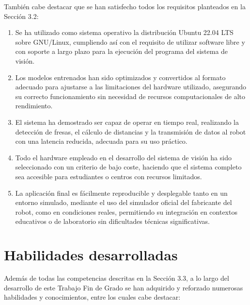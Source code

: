 También cabe destacar que se han satisfecho todos los requisitos planteados en la Sección 3.2:

\begin{enumerate}
    \item Se ha utilizado como sistema operativo la distribución Ubuntu 22.04 LTS sobre GNU/Linux, cumpliendo así con el requisito de utilizar software libre y con soporte a largo plazo para la ejecución del programa del sistema de visión.
    \item Los modelos entrenados han sido optimizados y convertidos al formato adecuado para ajustarse a las limitaciones del hardware utilizado, asegurando su correcto funcionamiento sin necesidad de recursos computacionales de alto rendimiento.
    \item El sistema ha demostrado ser capaz de operar en tiempo real, realizando la detección de fresas, el cálculo de distancias y la transmisión de datos al robot con una latencia reducida, adecuada para su uso práctico.
    \item Todo el hardware empleado en el desarrollo del sistema de visión ha sido seleccionado con un criterio de bajo coste, haciendo que el sistema completo sea accesible para estudiantes o centros con recursos limitados.
    \item La aplicación final es fácilmente reproducible y desplegable tanto en un entorno simulado, mediante el uso del simulador oficial del fabricante del robot, como en condiciones reales, permitiendo su integración en contextos educativos o de laboratorio sin dificultades técnicas significativas.
\end{enumerate}

\section{Habilidades desarrolladas}
\label{sec:habilidades_desarrolladas}

Además de todas las competencias descritas en la Sección 3.3, a lo largo del desarrollo de este Trabajo Fin de Grado se han adquirido y reforzado numerosas habilidades y conocimientos, entre los cuales cabe destacar:

